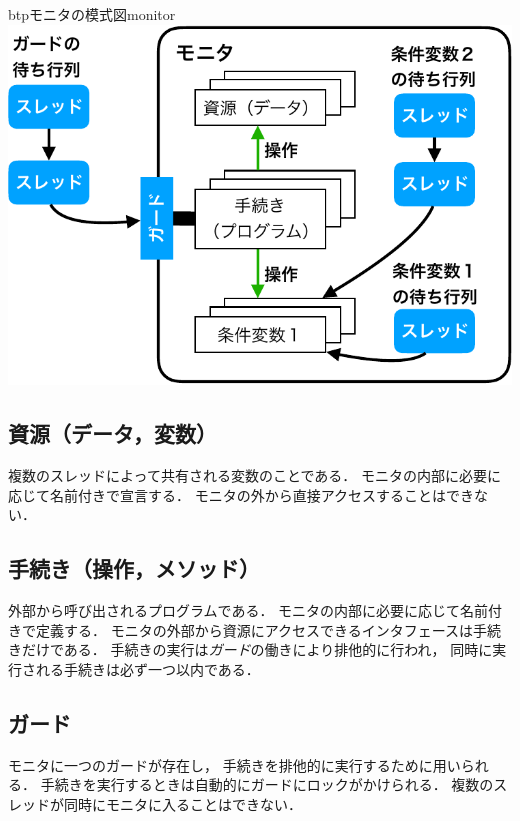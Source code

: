 
\begin{myfig}{btp}{モニタの模式図}{monitor}
  \includegraphics[scale=0.6]{Fig/monitor-crop.pdf}
\end{myfig}

\subsection{資源（データ，変数）}
複数のスレッドによって共有される変数のことである．
モニタの内部に必要に応じて名前付きで宣言する．
モニタの外から直接アクセスすることはできない．

\subsection{手続き（操作，メソッド）}
外部から呼び出されるプログラムである．
モニタの内部に必要に応じて名前付きで定義する．
モニタの外部から資源にアクセスできるインタフェースは手続きだけである．
手続きの実行は\emph{ガード}の働きにより排他的に行われ，
同時に実行される手続きは必ず一つ以内である．

\subsection{ガード}
モニタに一つのガードが存在し，
手続きを排他的に実行するために用いられる．
手続きを実行するときは自動的にガードにロックがかけられる．
複数のスレッドが同時にモニタに入ることはできない．

